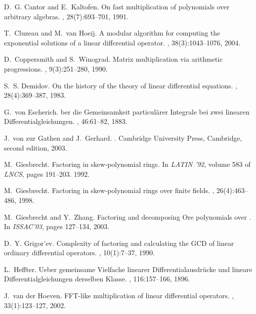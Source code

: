 \documentclass{sig-alt-full}
\def\gathen#1{{#1}}
\def\hoeven#1{{#1}}
\begin{document}
\begin{thebibliography}{10}
D.~G. Cantor and E.~Kaltofen.
\newblock On fast multiplication of polynomials over arbitrary algebras.
, 28(7):693--701, 1991.

T.~Cluzeau and M.~van Hoeij.
\newblock A modular algorithm for computing the exponential solutions of a
  linear differential operator.
, 38(3):1043--1076, 2004.

D.~Coppersmith and S.~Winograd.
\newblock Matrix multiplication via arithmetic progressions.
, 9(3):251--280, 1990.

S.~S. Demidov.
\newblock On the history of the theory of linear differential equations.
, 28(4):369--387, 1983.

G.~\gathen{von} Escherich.
ber die {G}emeinsamkeit particul{\"a}rer {I}nte\-grale bei zwei
  linearen {D}ifferentialgleichungen.
, 46:61--82, 1883.

J.~\gathen{von zur} Gathen and J.~Gerhard.
.
\newblock Cambridge University Press, Cambridge, second edition, 2003.

M.~Giesbrecht.
\newblock Factoring in skew-polynomial rings.
\newblock In {\em LATIN '92}, volume 583 of {\em LNCS}, pages 191--203. 1992.

M.~Giesbrecht.
\newblock Factoring in skew-polynomial rings over finite fields.
, 26(4):463--486, 1998.

M.~Giesbrecht and Y.~Zhang.
\newblock Factoring and decomposing {O}re polynomials over {}.
\newblock In {\em ISSAC'03}, pages 127--134, 2003.

D.~Y. Grigor'ev.
\newblock Complexity of factoring and calculating the {GCD} of linear ordinary
  differential operators.
, 10(1):7--37, 1990.

L.~Heffter.
\newblock Ueber gemeinsame {V}ielfache linearer {D}ifferentialausdr{\"u}cke und
  lineare {D}ifferentialgleichungen derselben {K}lasse.
, 116:157--166, 1896.

J.~\hoeven{van der} Hoeven.
\newblock F{FT}-like multiplication of linear differential operators.
, 33(1):123--127, 2002.


\end{thebibliography}
\end{document}
